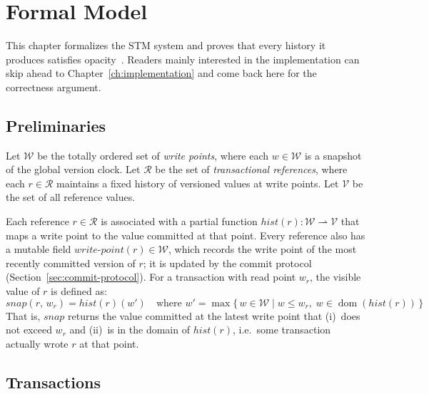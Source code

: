 \chapter{Formal Model}
\label{ch:formal-model}

This chapter formalizes the STM system and proves that every history it
produces satisfies opacity~\cite{guerraoui2007}. Readers mainly interested in
the implementation can skip ahead to Chapter~\ref{ch:implementation} and come
back here for the correctness argument.

\section{Preliminaries}

Let $\mathcal{W}$ be the totally ordered set of \emph{write points}, where each
$w \in \mathcal{W}$ is a snapshot of the global version clock. Let $\mathcal{R}$
be the set of \emph{transactional references}, where each $r \in \mathcal{R}$
maintains a fixed history of versioned values at write points.
Let $\mathcal{V}$ be the set of all reference values.

Each reference $r \in \mathcal{R}$ is associated with a partial function
$\mathit{hist}(r) : \mathcal{W} \rightharpoonup \mathcal{V}$ that maps a write
point to the value committed at that point. Every reference also has a
mutable field $\mathit{write\text{-}point}(r) \in \mathcal{W}$, which records
the write point of the most recently committed version of $r$; it is updated
by the commit protocol (Section~\ref{sec:commit-protocol}). For a transaction
with read point $w_r$, the visible value of $r$ is defined as:
\[
  \mathit{snap}(r,\, w_r)
  = \mathit{hist}(r)(w')
  \quad \text{where } w' = \max\bigl\{\, w \in \mathcal{W}
  \mid w \leq w_r,\; w \in \operatorname{dom}(\mathit{hist}(r)) \,\bigr\}
\]
That is, $\mathit{snap}$ returns the value committed at the latest write point
that (i)~does not exceed $w_r$ and (ii)~is in the domain of $\mathit{hist}(r)$,
i.e.\ some transaction actually wrote $r$ at that point.

\section{Transactions}


